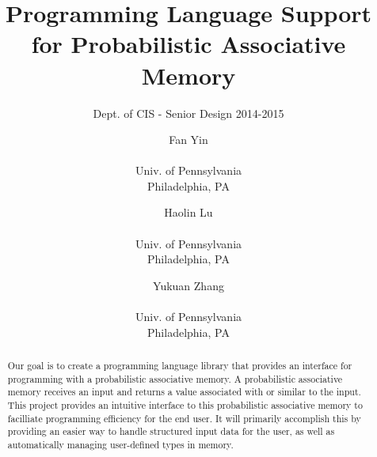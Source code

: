 \documentclass{sig-alternate}
\begin{document}
 

\title{Programming Language Support for Probabilistic Associative Memory}
\subtitle{Dept. of CIS - Senior Design 2014-2015} %
\author{
    Fan Yin \\  \\Univ. of Pennsylvania \\ Philadelphia, PA
    \and Haolin Lu \\  \\Univ. of Pennsylvania \\ Philadelphia, PA
    \and Yukuan Zhang\\  \\Univ. of Pennsylvania \\ Philadelphia, PA
}
%
%
\date{}
\maketitle


\begin{abstract}
    Our goal is to create a programming language library that provides an interface
    for programming with a probabilistic associative memory.
    A probabilistic associative memory receives an input and returns a value associated with
    or similar to the input. This project provides an intuitive interface to this probabilistic
    associative memory to facilliate programming efficiency for the end user. It will primarily
    accomplish this by providing an easier way to handle structured input data for the user, as well
    as automatically managing user-defined types in memory.
\end{abstract}
\end{document}
